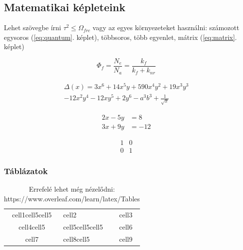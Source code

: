 \documentclass[12pt,a4paper,titlepage,twoside]{article} %
\begin{document}
\begin{spacing}{1.5}
\subsection{Matematikai képleteink}

Lehet szövegbe írni $\tau^{2} \leq \Omega_{frc}$ vagy az egyes környezeteket használni: számozott egysoros (\ref{eq:quantum}. képlet), többsoros, több egyenlet, mátrix (\ref{eq:matrix}. képlet)

\begin{equation}
	\Phi_f = \frac{N_e}{N_a} = \frac{k_{f}}{k_{f} + k_{nr}}
	\label{eq:quantum}
\end{equation}

\begin{multline*}
	\Delta(x) = 3x^6 + 14x^5y + 590x^4y^2 + 19x^3y^3\\ 
	- 12x^2y^4 - 12xy^5 + 2y^6 - a^3b^3 + \frac{1}{\sqrt{x}}
\end{multline*}

\begin{align*} 
	2x - 5y &=  8 \\
	3x + 9y &=  -12
	\label{eq:align}
\end{align*}

\begin{equation}
	\begin{matrix}
		1 & 0\\
		0 & 1
	\end{matrix}
	\label{eq:matrix}
\end{equation}

\subsubsection{Táblázatok}

\begin{table}
	\centering
	\begin{tabular}{ |c|l|p{3cm}| } 
		 \hline
		 cell1cell5cell5 & cell2 & cell3 \\ 
		 cell4cell5 & cell5cell5cell5 & cell6 \\ 
		 cell7 & cell8cell5 & cell9 \\ 
		 \hline
	\end{tabular}
	\label{tab:table}
	\caption{Errefelé lehet még nézelődni: https://www.overleaf.com/learn/latex/Tables}
\end{table}


\end{spacing}
\end{document}
